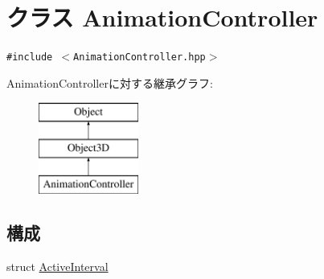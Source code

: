 \hypertarget{classm3g_1_1AnimationController}{
\section{クラス AnimationController}
\label{classm3g_1_1AnimationController}
}
{\tt \#include $<$AnimationController.hpp$>$}

AnimationControllerに対する継承グラフ:\begin{figure}[H]
\begin{center}
\leavevmode
\includegraphics[height=3cm]{classm3g_1_1AnimationController}
\end{center}
\end{figure}
\subsection*{構成}
\begin{CompactItemize}
\item 
struct \hyperlink{structm3g_1_1AnimationController_1_1ActiveInterval}{ActiveInterval}
\end{CompactItemize}
